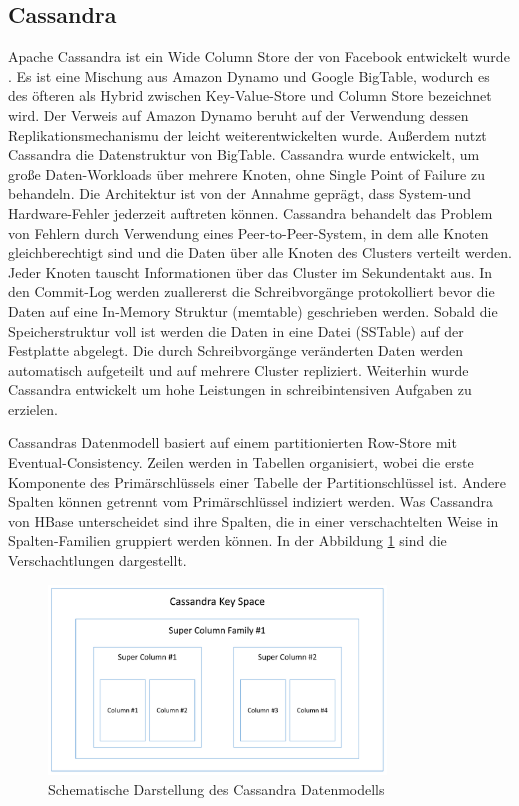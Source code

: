 \subsection{Cassandra} 
\label{ch:AnalyseDatenbanken:sec:Datenbanken:subsec:Cassandra}
Apache Cassandra ist ein Wide Column Store der von Facebook entwickelt wurde \cite{Lakshman:2010:CDS:1773912.1773922}. Es ist eine Mischung aus Amazon Dynamo und Google BigTable, wodurch es des öfteren als Hybrid zwischen Key-Value-Store und Column Store bezeichnet wird. Der Verweis auf Amazon Dynamo beruht auf der Verwendung dessen Replikationsmechanismu der leicht weiterentwickelten wurde. Außerdem nutzt Cassandra die Datenstruktur von BigTable. Cassandra wurde entwickelt, um große Daten-Workloads über mehrere Knoten, ohne Single Point of Failure zu behandeln. Die Architektur ist von der Annahme geprägt, dass System-und Hardware-Fehler jederzeit auftreten können. Cassandra behandelt das Problem von Fehlern durch Verwendung eines Peer-to-Peer-System, in dem alle Knoten gleichberechtigt sind und die Daten über alle Knoten des Clusters verteilt werden. Jeder Knoten tauscht Informationen über das Cluster im Sekundentakt aus. In den Commit-Log werden zuallererst die Schreibvorgänge protokolliert bevor die Daten auf eine In-Memory Struktur (memtable) geschrieben werden. Sobald die Speicherstruktur voll ist werden die Daten in eine Datei (SSTable) auf der Festplatte abgelegt. Die durch Schreibvorgänge veränderten Daten werden automatisch aufgeteilt und auf mehrere Cluster repliziert. Weiterhin wurde Cassandra entwickelt um hohe Leistungen in schreibintensiven Aufgaben zu erzielen.

Cassandras Datenmodell basiert auf einem partitionierten Row-Store mit Eventual-Consistency. Zeilen werden in Tabellen organisiert, wobei die erste Komponente des Primärschlüssels einer Tabelle der Partitionschlüssel ist. Andere Spalten können getrennt vom Primärschlüssel indiziert werden. Was Cassandra von HBase unterscheidet sind ihre Spalten, die in einer verschachtelten Weise in Spalten-Familien gruppiert werden können. In der Abbildung \ref{db_cassandra} sind die Verschachtlungen dargestellt.

\begin{figure}[htbp]
\centering
  \includegraphics[width=0.8\textwidth, width=0.8\textwidth]{pics/cassandra.pdf}
\caption{Schematische Darstellung des Cassandra Datenmodells}
\label{db_cassandra}
\end{figure} 

